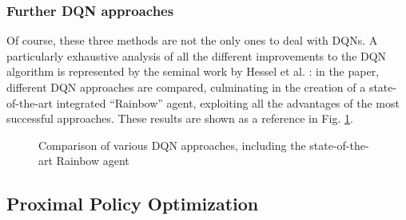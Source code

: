 \documentclass[a4paper, 12pt]{article}
\numberwithin{equation}{section}
\begin{document}
\subsubsection{Further DQN approaches}

Of course, these three methods are not the only ones to deal with DQNs. A particularly exhaustive analysis of all the different improvements to the DQN algorithm is represented by the seminal work by Hessel et al. \cite{rainbow}: in the paper, different DQN approaches are compared, culminating in the creation of a state-of-the-art integrated ``Rainbow'' agent, exploiting all the advantages of the most successful approaches. These results are shown as a reference in Fig. \ref{fig:rainbow}.

\begin{figure}[h]
	\centering
		\caption{Comparison of various DQN approaches, including the state-of-the-art Rainbow agent}
	\label{fig:rainbow}
\end{figure}



\subsection{Proximal Policy Optimization}
\end{document}

